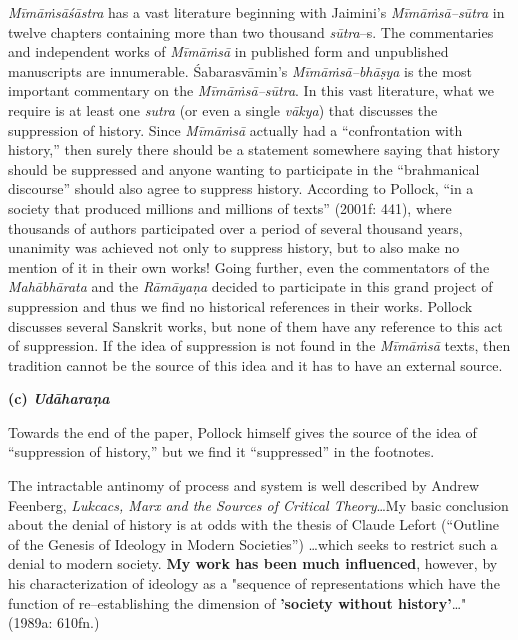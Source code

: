\textit{Mīmāṁsāśāstra} has a vast literature beginning with Jaimini’s \textit{Mīmāṁsā–sūtra} in twelve chapters containing more than two thousand \textit{sūtra}–s. The commentaries and independent works of \textit{Mīmāṁsā} in published form and unpublished manuscripts are innumerable. Śabarasvāmin’s \textit{Mīmāṁsā–bhāṣya} is the most important commentary on the \textit{Mīmāṁsā–sūtra}. In this vast literature, what we require is at least one \textit{sutra }(or even a single \textit{vākya}) that discusses the suppression of history. Since \textit{Mīmāṁsā} actually had a “confrontation with history,” then surely there should be a statement somewhere saying that history should be suppressed and anyone wanting to participate in the “brahmanical discourse” should also agree to suppress history. According to Pollock, “in a society that produced millions and millions of texts” (2001f: 441), where thousands of authors participated over a period of several thousand years, unanimity was achieved not only to suppress history, but to also make no mention of it in their own works! Going further, even the commentators of the \textit{Mahābhārata} and the \textit{Rāmāyaṇa }decided to participate in this grand project of suppression and thus we find no historical references in their works. Pollock discusses several Sanskrit works, but none of them have any reference to this act of suppression. If the idea of suppression is not found in the\textit{ Mīmāṁsā} texts, then tradition cannot be the source of this idea and it has to have an external source.

\textbf{(c) \textit{Udāharaṇa}}

Towards the end of the paper, Pollock himself gives the source of the idea of “suppression of history,” but we find it “suppressed” in the footnotes.

\begin{myquote}
The intractable antinomy of process and system is well described by Andrew Feenberg, \textit{Lukcacs, Marx and the Sources of Critical Theory}…My basic conclusion about the denial of history is at odds with the thesis of Claude Lefort (“Outline of the Genesis of Ideology in Modern Societies”) …which seeks to restrict such a denial to modern society. \textbf{My work has been much influenced}, however, by his characterization of ideology as a "sequence of representations which have the function of re–establishing the dimension of \textbf{'society without history'}…" (1989a: 610fn.)
\end{myquote}

